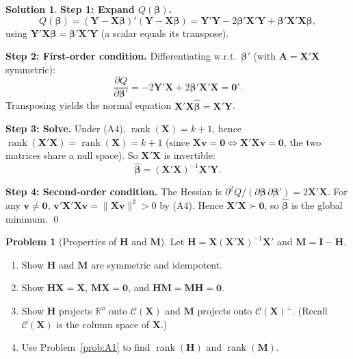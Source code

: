 \documentclass[12pt,a4paper]{article}
\theoremstyle{definition}
\newtheorem{exercise}{Problem}
\newtheorem*{solution*}{Solution}
\DeclareMathOperator\rank{rank}
\newcommand{\bX}{\mathbf{X}}
\newcommand{\bY}{\mathbf{Y}}
\def\bb{\boldsymbol{\beta}}
\newcommand{\bI}{\mathbf{I}}
\newcommand{\bH}{\mathbf{H}}
\newcommand{\bM}{\mathbf{M}}
\newcommand{\bzero}{\mathbf{0}}
\newcommand{\bA}{\mathbf{A}}
\newcommand{\bv}{\mathbf{v}}
\newcommand{\Real}{\mathbb{R}}
\newcommand{\calC}{\mathcal{C}}
\begin{document}
\begin{solution*}
\textbf{Step 1: Expand $Q(\bb)$.}
\[
Q(\bb) = (\bY - \bX\bb)'(\bY - \bX\bb) = \bY'\bY - 2\bb'\bX'\bY + \bb'\bX'\bX\bb,
\]
using $\bY'\bX\bb = \bb'\bX'\bY$ (a scalar equals its transpose).

\textbf{Step 2: First-order condition.} Differentiating w.r.t.\ $\bb'$ (with $\bA = \bX'\bX$ symmetric):
\[
\frac{\partial Q}{\partial \bb'} = -2\bY'\bX + 2\bb'\bX'\bX = \bzero'.
\]
Transposing yields the normal equation $\bX'\bX\hat{\bb} = \bX'\bY$.

\textbf{Step 3: Solve.} Under (A4), $\rank(\bX) = k+1$, hence $\rank(\bX'\bX) = \rank(\bX) = k+1$ (since $\bX\bv = \bzero \Leftrightarrow \bX'\bX\bv = \bzero$, the two matrices share a null space). So $\bX'\bX$ is invertible:
\[
\hat{\bb} = (\bX'\bX)^{-1}\bX'\bY.
\]

\textbf{Step 4: Second-order condition.} The Hessian is $\partial^2 Q/(\partial\bb\,\partial\bb') = 2\bX'\bX$. For any $\bv \neq \bzero$, $\bv'\bX'\bX\bv = \|\bX\bv\|^2 > 0$ by (A4). Hence $\bX'\bX \succ \bzero$, so $\hat{\bb}$ is the global minimum. \qed
\end{solution*}

\begin{exercise}[Properties of $\bH$ and $\bM$]\label{prob:A3}
Let $\bH = \bX(\bX'\bX)^{-1}\bX'$ and $\bM = \bI - \bH$.
\begin{enumerate}[label=(\alph*),nosep]
\item Show $\bH$ and $\bM$ are symmetric and idempotent.
\item Show $\bH\bX = \bX$, $\bM\bX = \bzero$, and $\bH\bM = \bM\bH = \bzero$.
\item Show $\bH$ projects $\Real^n$ onto $\calC(\bX)$ and $\bM$ projects onto $\calC(\bX)^\perp$. (Recall $\calC(\bX)$ is the column space of $\bX$.)
\item Use Problem~\ref{prob:A1} to find $\rank(\bH)$ and $\rank(\bM)$.
\end{enumerate}
\end{exercise}
\end{document}

